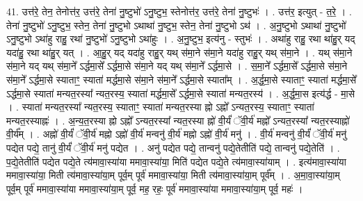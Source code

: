 \documentclass[17pt]{extarticle}
\begin{document}
41. उत्त॑रे॒ तेन॒ तेनोत्त॑र॒ उत्त॑रे॒ तेना॑ नु॒ष्टुभो॑ ऽनु॒ष्टुभ॒ स्तेनोत्त॑र॒ उत्त॑रे॒ तेना॑ नु॒ष्टुभः॑ । . उत्त॑र॒ इत्युत् - त॒रे॒ । . तेना॑ नु॒ष्टुभो॑ ऽनु॒ष्टुभ॒ स्तेन॒ तेना॑ नु॒ष्टुभो ऽथाथा॑ नु॒ष्टुभ॒ स्तेन॒ तेना॑ नु॒ष्टुभो ऽथ॑ । . अ॒नु॒ष्टुभो ऽथाथा॑ नु॒ष्टुभो॑ ऽनु॒ष्टुभो ऽथा॑हु राहु॒ रथा॑ नु॒ष्टुभो॑ ऽनु॒ष्टुभो ऽथा॑हुः । . अ॒नु॒ष्टुभ॒ इत्य॑नु - स्तुभः॑ । . अथा॑हु राहु॒ रथा था॑हु॒र् यद् यदा॑हु॒ रथा था॑हु॒र् यत् । . आ॒हु॒र् यद् यदा॑हु राहु॒र् यथ् स॑मा॒ने स॑मा॒ने यदा॑हु राहु॒र् यथ् स॑मा॒ने । . यथ् स॑मा॒ने स॑मा॒ने यद् यथ् स॑मा॒ने᳚ ऽर्द्धमा॒से᳚ ऽर्द्धमा॒से स॑मा॒ने यद् यथ् स॑मा॒ने᳚ ऽर्द्धमा॒से । . स॒मा॒ने᳚ ऽर्द्धमा॒से᳚ ऽर्द्धमा॒से स॑मा॒ने स॑मा॒ने᳚ ऽर्द्धमा॒से स्याताꣳ॒॒ स्याता॑ मर्द्धमा॒से स॑मा॒ने स॑मा॒ने᳚ ऽर्द्धमा॒से स्याता᳚म् । . अ॒र्द्ध॒मा॒से स्याताꣳ॒॒ स्याता॑ मर्द्धमा॒से᳚ ऽर्द्धमा॒से स्याता॑ मन्यत॒रस्या᳚ न्यत॒रस्य॒ स्याता॑ मर्द्धमा॒से᳚ ऽर्द्धमा॒से स्याता॑ मन्यत॒रस्य॑ । . अ॒र्द्ध॒मा॒स इत्य॑र्द्ध - मा॒से । . स्याता॑ मन्यत॒रस्या᳚ न्यत॒रस्य॒ स्याताꣳ॒॒ स्याता॑ मन्यत॒रस्या ह्नो ऽह्नो᳚ ऽन्यत॒रस्य॒ स्याताꣳ॒॒ स्याता॑ मन्यत॒रस्याह्नः॑ । . अ॒न्य॒त॒रस्या ह्नो ऽह्नो᳚ ऽन्यत॒रस्या᳚ न्यत॒रस्या ह्नो॑ वी॒र्यं॑ ॅवी॒र्य॑ मह्नो᳚ ऽन्यत॒रस्या᳚ न्यत॒रस्याह्नो॑ वी॒र्य᳚म् । . अह्नो॑ वी॒र्यं॑ ॅवी॒र्य॑ मह्नो ऽह्नो॑ वी॒र्य॑ मन्वनु॑ वी॒र्य॑ मह्नो ऽह्नो॑ वी॒र्य॑ मनु॑ । . वी॒र्य॑ मन्वनु॑ वी॒र्यं॑ ॅवी॒र्य॑ मनु॑ पद्येत पद्ये॒ तानु॑ वी॒र्यं॑ ॅवी॒र्य॑ मनु॑ पद्येत । . अनु॑ पद्येत पद्ये॒ तान्वनु॑ पद्ये॒तेतीति॑ पद्ये॒ तान्वनु॑ पद्ये॒तेति॑ । . प॒द्ये॒तेतीति॑ पद्येत पद्ये॒ते त्य॑मावा॒स्या॑या ममावा॒स्या॑या॒ मिति॑ पद्येत पद्ये॒ते त्य॑मावा॒स्या॑याम् । . इत्य॑मावा॒स्या॑या ममावा॒स्या॑या॒ मिती त्य॑मावा॒स्या॑या॒म् पूर्व॒म् पूर्व॑ ममावा॒स्या॑या॒ मिती त्य॑मावा॒स्या॑या॒म् पूर्व᳚म् । . अ॒मा॒वा॒स्या॑या॒म् पूर्व॒म् पूर्व॑ ममावा॒स्या॑या ममावा॒स्या॑या॒म् पूर्व॒ मह॒ रहः॒ पूर्व॑ ममावा॒स्या॑या ममावा॒स्या॑या॒म् पूर्व॒ महः॑ । \newline
\end{document}
